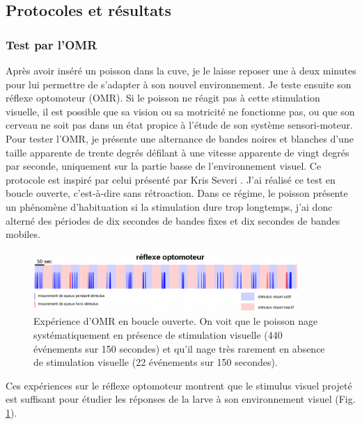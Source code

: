 \subsection{Protocoles et résultats}

\subsubsection{Test par l'OMR}
Après avoir inséré un poisson dans la cuve, je le laisse reposer une à deux minutes pour lui permettre de s'adapter à son nouvel environnement. Je teste ensuite son réflexe optomoteur (OMR). Si le poisson ne réagit pas à cette stimulation visuelle, il est possible que sa vision ou sa motricité ne fonctionne pas, ou que son cerveau ne soit pas dans un état propice à l'étude de son système sensori-moteur. Pour tester l'OMR, je présente une alternance de bandes noires et blanches d'une taille apparente de trente degrés défilant à une vitesse apparente de vingt degrés par seconde, uniquement sur la partie basse de l'environnement visuel. Ce protocole est inspiré par celui présenté par Kris Severi \cite{severi_neural_2014}. J'ai réalisé ce test en boucle ouverte, c'est-à-dire sans rétroaction. Dans ce régime, le poisson présente un phénomène d'habituation si la stimulation dure trop longtemps, j'ai donc alterné des périodes de dix secondes de bandes fixes et dix secondes de bandes mobiles.


\begin{figure}
\centering
\includegraphics[width=0.9\textwidth]{./files/omr.png}
\caption{Expérience d'OMR en boucle ouverte. On voit que le poisson nage systématiquement en présence de stimulation visuelle (440 événements sur 150 secondes) et qu'il nage très rarement en absence de stimulation visuelle (22 événements sur 150 secondes).}
\label{FigOMRopenloop}
\end{figure}

Ces expériences sur le réflexe optomoteur montrent que le stimulus visuel projeté est suffisant pour étudier les réponses de la larve à son environnement visuel (Fig. \ref{FigOMRopenloop}).

